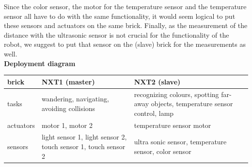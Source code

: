 \documentclass[11pt,a4paper]{article}
\begin{document}
Since the color sensor, the motor for the temperature sensor and the temperature sensor all have to do with the same functionality, it would seem logical to put these sensors and actuators on the same brick. Finally, as the measurement of the distance with the ultrasonic sensor is not crucial for the functionality of the robot, we suggest to put that sensor on the (slave) brick for the measurements as well.\\

\textbf{Deployment diagram}\\
\begin{tabular}{|p{3cm}|p{6cm}|p{6cm}|} 
\hline
\textbf{brick} & \textbf{NXT1 (master)} & \textbf{NXT2 (slave)}\\
\hline
tasks & wandering, navigating, avoiding collisions & recognizing colours, spotting far-away objects, temperature sensor control, lamp\\\hline
actuators & motor 1, motor 2 & temperature sensor motor\\\hline
sensors & light sensor 1, light sensor 2, touch sensor 1, touch sensor 2 & ultra sonic sensor, temperature sensor, color sensor\\
\hline
\end{tabular}
\end{document}
